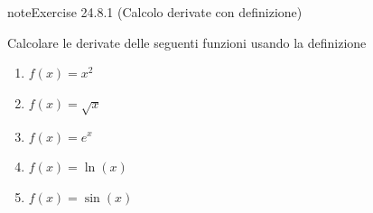 \documentclass[letterpaper,10pt,italian]{jupyterBook}
\begin{document}
\begin{sphinxadmonition}{note}{Exercise 24.8.1 (Calcolo derivate con definizione)}



\sphinxAtStartPar
Calcolare le derivate delle seguenti funzioni usando la definizione
\begin{enumerate}
%
\item {} 
\sphinxAtStartPar
\(f(x) = x^2\)

\item {} 
\sphinxAtStartPar
\(f(x) = \sqrt{x}\)

\item {} 
\sphinxAtStartPar
\(f(x) = e^x\)

\item {} 
\sphinxAtStartPar
\(f(x) = \ln(x)\)

\item {} 
\sphinxAtStartPar
\(f(x) = \sin(x)\)

\end{enumerate}

\sphinxAtStartPar
{}
\end{sphinxadmonition}
 \label{exercise:ch/infinitesimal_calculus/derivatives-problems-exercise-1}
\end{document}
